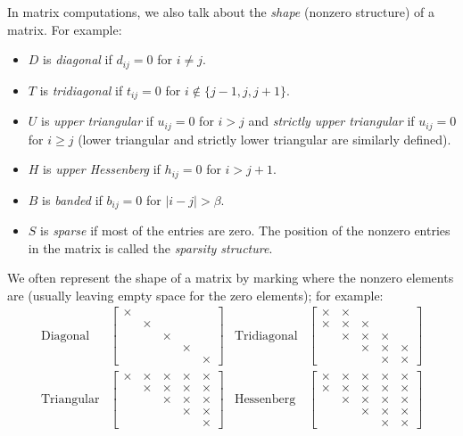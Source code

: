 \documentclass[12pt, leqno]{article} %
\begin{document}
In matrix computations, we also talk about the {\em shape} (nonzero
structure) of a matrix.  For example:
\begin{itemize}
\item $D$ is {\em diagonal} if $d_{ij} = 0$ for $i \neq j$.
\item $T$ is {\em tridiagonal} if $t_{ij} = 0$ for $i \not \in \{j-1,
  j, j+1\}$.
\item $U$ is {\em upper triangular} if $u_{ij} = 0$ for $i > j$
  and {\em strictly upper triangular} if $u_{ij} = 0$ for $i \geq j$
  (lower triangular and strictly lower triangular are similarly
  defined).
\item $H$ is {\em upper Hessenberg} if $h_{ij} = 0$ for $i > j+1$.
\item $B$ is {\em banded} if $b_{ij} = 0$ for $|i-j| > \beta$.
\item $S$ is {\em sparse} if most of the entries are zero.  The
  position of the nonzero entries in the matrix is called the
  {\em sparsity structure}.
\end{itemize}
We often represent the shape of a matrix by marking where the nonzero
elements are (usually leaving empty space for the zero elements); for
example:
\begin{align*}
  \mbox{Diagonal} &
  \begin{bmatrix}
    \times & & & & \\
    & \times & & & \\
    & & \times & & \\
    & & & \times & \\
    & & & & \times
  \end{bmatrix} &
  \mbox{Tridiagonal} &
  \begin{bmatrix}
    \times & \times & & & \\
    \times & \times & \times & & \\
    & \times & \times & \times & \\
    & & \times & \times & \times \\
    & & & \times & \times
  \end{bmatrix} \\
  \mbox{Triangular} &
  \begin{bmatrix}
    \times & \times & \times & \times & \times \\
    & \times & \times & \times & \times \\
    & & \times & \times & \times \\
    & & & \times & \times \\
    & & & & \times
  \end{bmatrix} &
  \mbox{Hessenberg} &
  \begin{bmatrix}
    \times & \times & \times & \times & \times \\
    \times & \times & \times & \times & \times \\
    & \times & \times & \times & \times \\
    & & \times & \times & \times \\
    & & & \times & \times
  \end{bmatrix} \\
\end{align*}
\end{document}
